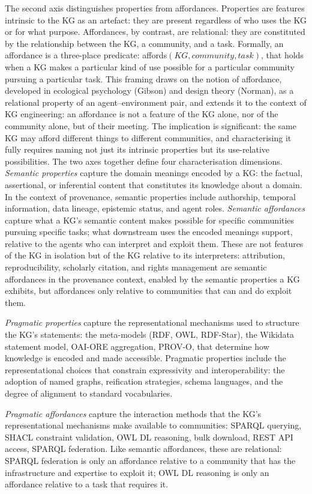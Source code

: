 \documentclass[runningheads]{llncs}
\newcommand{\add}[1]{\textcolor{addedcolor}{#1}}
\begin{document}
\add{The second axis distinguishes properties from affordances. Properties are features intrinsic to the KG as an artefact: they are present regardless of who uses the KG or for what purpose. Affordances, by contrast, are relational: they are constituted by the relationship between the KG, a community, and a task. Formally, an affordance is a three-place predicate: affords$(KG, community, task)$, that holds when a KG makes a particular kind of use possible for a particular community pursuing a particular task. This framing draws on the notion of affordance, developed in ecological psychology (Gibson) and design theory (Norman), as a relational property of an agent–environment pair, and extends it to the context of KG engineering: an affordance is not a feature of the KG alone, nor of the community alone, but of their meeting. The implication is significant: the same KG may afford different things to different communities, and characterising it fully requires naming not just its intrinsic properties but its use-relative possibilities.}
\add{The two axes together define four characterisation dimensions.
\emph{Semantic properties} capture the domain meanings encoded by a KG: the factual, assertional, or inferential content that constitutes its knowledge about a domain. In the context of provenance, semantic properties include authorship, temporal information, data lineage, epistemic status, and agent roles.
\emph{Semantic affordances} capture what a KG's semantic content makes possible for specific communities pursuing specific tasks; what downstream uses the encoded meanings support, relative to the agents who can interpret and exploit them. These are not features of the KG in isolation but of the KG relative to its interpreters: attribution, reproducibility, scholarly citation, and rights management are semantic affordances in the provenance context, enabled by the semantic properties a KG exhibits, but affordances only relative to communities that can and do exploit them.}

\add{\emph{Pragmatic properties} capture the representational mechanisms used to structure the KG's statements: the meta-models (RDF, OWL, RDF-Star), the Wikidata statement model, OAI-ORE aggregation, PROV-O, that determine how knowledge is encoded and made accessible. Pragmatic properties include the representational choices that constrain expressivity and interoperability: the adoption of named graphs, reification strategies, schema languages, and the degree of alignment to standard vocabularies.}

\add{\emph{Pragmatic affordances} capture the interaction methods that the KG's representational mechanisms make available to communities: SPARQL querying, SHACL constraint validation, OWL DL reasoning, bulk download, REST API access, SPARQL federation. Like semantic affordances, these are relational: SPARQL federation is only an affordance relative to a community that has the infrastructure and expertise to exploit it; OWL DL reasoning is only an affordance relative to a task that requires it.}
\end{document}
